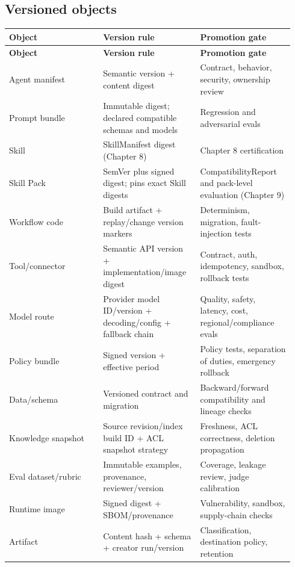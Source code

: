 \subsection{Versioned objects}

\BookTableStart
\small
\begin{longtable}{@{}Y{0.3133\linewidth}Y{0.3133\linewidth}Y{0.3133\linewidth}@{}}
\color{white}\bfseries \textbf{Object} & \color{white}\bfseries \textbf{Version rule} & \color{white}\bfseries \textbf{Promotion gate} \\
\endfirsthead
{}
\color{white}\bfseries \textbf{Object} & \color{white}\bfseries \textbf{Version rule} & \color{white}\bfseries \textbf{Promotion gate} \\
\endhead
Agent manifest & Semantic version + content digest & Contract, behavior, security, ownership review \\
Prompt bundle & Immutable digest; declared compatible schemas and models & Regression and adversarial evals \\
Skill & SkillManifest digest (Chapter 8) & Chapter 8 certification \\
Skill Pack & SemVer plus signed digest; pins exact Skill digests & CompatibilityReport and pack-level evaluation (Chapter 9) \\
Workflow code & Build artifact + replay/change version markers & Determinism, migration, fault-injection tests \\
Tool/connector & Semantic API version + implementation/image digest & Contract, auth, idempotency, sandbox, rollback tests \\
Model route & Provider model ID/version + decoding/config + fallback chain & Quality, safety, latency, cost, regional/compliance evals \\
Policy bundle & Signed version + effective period & Policy tests, separation of duties, emergency rollback \\
Data/schema & Versioned contract and migration & Backward/forward compatibility and lineage checks \\
Knowledge snapshot & Source revision/index build ID + ACL snapshot strategy & Freshness, ACL correctness, deletion propagation \\
Eval dataset/rubric & Immutable examples, provenance, reviewer/version & Coverage, leakage review, judge calibration \\
Runtime image & Signed digest + SBOM/provenance & Vulnerability, sandbox, supply-chain checks \\
Artifact & Content hash + schema + creator run/version & Classification, destination policy, retention \\
\end{longtable}
\BookTableEnd

